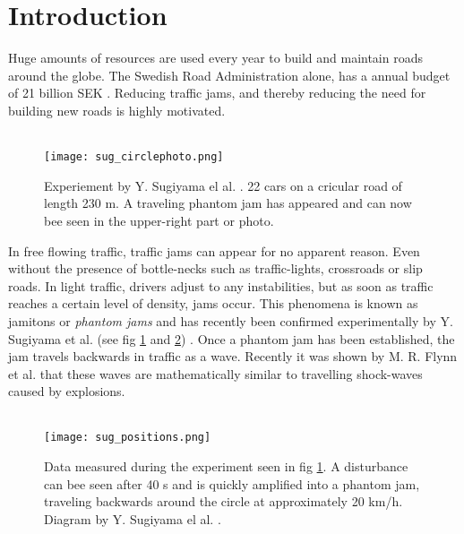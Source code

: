 \section{Introduction}

Huge amounts of resources are used every year to build and maintain roads
around the globe. The Swedish Road Administration alone, has a annual budget
of 21 billion SEK \cite{vagverket}. Reducing traffic jams, and thereby
reducing the need for building new roads is highly motivated.\\\\

\begin{figure}[H]
    \begin{center}
    \texttt{[image: sug\_circlephoto.png]}
    \caption{\label{sug_photo}
Experiement by Y. Sugiyama el al. \cite{sugiyama}. 22 cars on a cricular road
of length 230 m. A traveling phantom jam has appeared and can now bee seen in
the upper-right part or photo.
} \end{center} \end{figure}

In free flowing traffic, traffic jams can appear for no apparent reason. Even
without the presence of bottle-necks such as traffic-lights, crossroads or
slip roads. In light traffic, drivers adjust to any
instabilities, but as soon as traffic reaches a certain level of density, jams
occur. This phenomena is known as jamitons or \emph{phantom jams} and has
recently been confirmed experimentally by Y. Sugiyama et al. (see fig
\ref{sug_photo} and \ref{sug_positions}) \cite{sugiyama}. Once a phantom jam has been
established, the jam travels backwards in traffic as a wave. Recently it was
shown by M. R. Flynn et al. \cite{mit} that these waves are mathematically
similar to travelling shock-waves caused by explosions.\\\\

\begin{figure}[H]
    \begin{center}
    \texttt{[image: sug\_positions.png]}
    \caption{\label{sug_positions}
Data measured during the experiment seen in fig \ref{sug_photo}. A disturbance
can bee seen after 40 s and is quickly amplified into a phantom jam, traveling
backwards around the circle at approximately 20 km/h.
Diagram by Y. Sugiyama el al. \cite{sugiyama}.}
\end{center} \end{figure}

